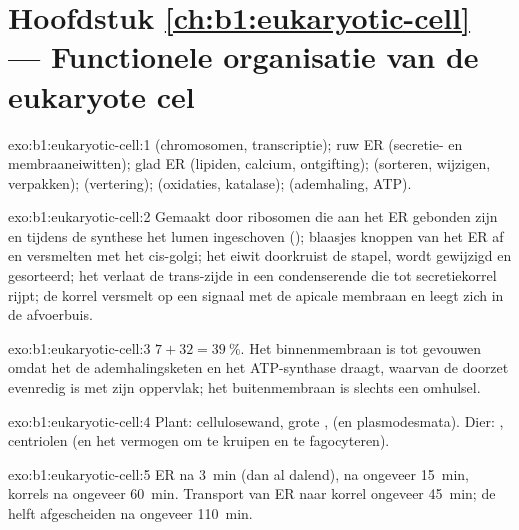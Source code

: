 \section*{Hoofdstuk \ref{ch:b1:eukaryotic-cell} --- Functionele organisatie van de eukaryote cel}

\begin{solution}{exo:b1:eukaryotic-cell:1}
 (chromosomen, transcriptie); ruw ER (secretie- en membraaneiwitten);
glad ER (lipiden, calcium, ontgifting);  (sorteren, wijzigen,
verpakken);  (vertering);  (oxidaties, katalase);
 (ademhaling, ATP).
\end{solution}

\begin{solution}{exo:b1:eukaryotic-cell:2}
Gemaakt door ribosomen die aan het  ER gebonden zijn en tijdens de synthese
het lumen ingeschoven (); blaasjes knoppen van het ER af en
versmelten met het cis-golgi; het eiwit doorkruist de stapel, wordt gewijzigd en
gesorteerd; het verlaat de trans-zijde in een condenserende  die tot
secretiekorrel rijpt; de korrel versmelt op een signaal met de apicale membraan
en leegt zich in de afvoerbuis.
\end{solution}

\begin{solution}{exo:b1:eukaryotic-cell:3}
$7 + 32 = \qty{39}{\%}$. Het binnenmembraan is tot  gevouwen omdat het de
ademhalingsketen en het ATP-synthase draagt, waarvan de doorzet evenredig is met
zijn oppervlak; het buitenmembraan is slechts een omhulsel.
\end{solution}

\begin{solution}{exo:b1:eukaryotic-cell:4}
Plant: cellulosewand, grote ,  (en plasmodesmata). Dier:
, centriolen (en het vermogen om te kruipen en te fagocyteren).
\end{solution}

\begin{solution}{exo:b1:eukaryotic-cell:5}
ER na \qty{3}{min} (dan al dalend),  na ongeveer \qty{15}{min},
korrels na ongeveer \qty{60}{min}. Transport van ER naar korrel ongeveer
\qty{45}{min}; de helft afgescheiden na ongeveer \qty{110}{min}.
\end{solution}

